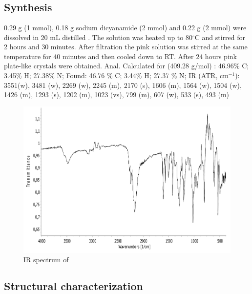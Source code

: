 \section{}
\subsection{Synthesis}
0.29 g  (1 mmol), 0.18 g sodium dicyanamide (2 mmol) and 0.22 g  (2 mmol) were dissolved in 20 mL distilled . The solution was heated up to 80$^\circ$C  and stirred for 2 hours and 30 minutes. After filtration the pink  solution was stirred at the same temperature for 40 minutes and then cooled down to RT. After 24 hours pink plate-like crystals were obtained.
Anal. Calculated for  (409.28 g/mol) : 46.96\% C; 3.45\% H; 27.38\% N;
Found: 46.76 \% C; 3.44\% H; 27.37 \% N;
IR (ATR, cm$^{-1}$): 3551(w), 3481 (w), 2269 (w), 2245 (m), 2170 (s), 1606 (m), 1564 (w), 1504 (w), 1426 (m), 1293 (s), 1202 (m), 1023 (vs), 799 (m), 607 (w), 533 (s), 493 (m)

\begin{figure}[h!]
\centering
\includegraphics[width=1\textwidth]{figures/CoD4HOMP-IR.pdf}
\caption{IR spectrum of }
\end{figure}

\newpage


\subsection{Structural characterization}

